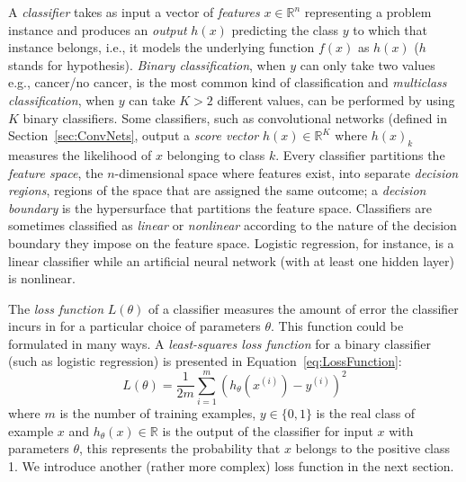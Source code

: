 A \emph{classifier} takes as input a vector of \emph{features} $x \in \mathbb{R}^n$ representing a problem instance and produces an \emph{output} $h(x)$ predicting the class $y$ to which that instance belongs, i.e., it models the underlying function $f(x)$ as $h(x)$ ($h$ stands for hypothesis). \emph{Binary classification}, when $y$ can only take two values e.g., cancer/no cancer, is the most common kind of classification and \emph{multiclass classification}, when $y$ can take $K > 2$ different values, can be performed by using $K$ binary classifiers. Some classifiers, such as convolutional networks (defined in Section~\ref{sec:ConvNets}, output a \emph{score vector} $h(x) \in \mathbb{R}^K$ where $h(x)_k$ measures the likelihood of $x$ belonging to class $k$. Every classifier partitions the \emph{feature space}, the $n$-dimensional space where features exist, into separate \emph{decision regions}, regions of the space that are assigned the same outcome; a \emph{decision boundary} is the hypersurface that partitions the feature space. Classifiers are sometimes classified as \emph{linear} or \emph{nonlinear} according to the nature of the decision boundary they impose on the feature space. Logistic regression, for instance, is a linear classifier while an artificial neural network (with at least one hidden layer) is nonlinear.

The \emph{loss function} $L(\theta)$ of a classifier measures the amount of error the classifier incurs in for a particular choice of parameters $\theta$. This function could be formulated in many ways. A \emph{least-squares loss function} for a binary classifier (such as logistic regression) is presented in Equation~\ref{eq:LossFunction}:
\begin{equation}
	L(\theta) = \frac{1}{2m}\sum_{i=1}^m(h_\theta(x^{(i)}) - y^{(i)})^2
	\label{eq:LossFunction}
\end{equation}
where $m$ is the number of training examples, $y \in \{0,1\}$ is the real class of example $x$ and $h_\theta(x) \in \mathbb{R}$ is the output of the classifier for input $x$ with parameters $\theta$, this represents the probability that $x$ belongs to the positive class 1. We introduce another (rather more complex) loss function in the next section.

